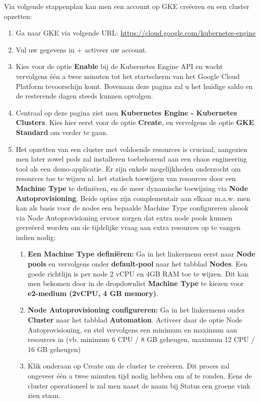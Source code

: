 Via volgende stappenplan kan men een account op GKE creëeren en een cluster opzetten: 
\begin{enumerate}
    \item Ga naar GKE via volgende URL: \url{https://cloud.google.com/kubernetes-engine}
    \item Vul uw gegevens in + activeer uw account.
    \item Kies voor de optie {\bf Enable} bij de Kubernetes Engine API en wacht vervolgens één a twee minuten tot het startscherm van het Google Cloud Platform tevoorschijn komt. Bovenaan deze pagina zal u het huidige saldo en de resterende dagen steeds kunnen opvolgen.
    \item Centraal op deze pagina ziet men {\bf Kubernetes Engine - Kubernetes Clusters}. Kies hier eerst voor de optie {\bf Create}, en vervolgens de optie {\bf GKE Standard} om verder te gaan. 
    \item Het opzetten van een cluster met voldoende resources is cruciaal, aangezien men later zowel pods zal installeren toebehorend aan een chaos engineering tool als een demo-applicatie. 
    \newline Er zijn enkele mogelijkheden onderzocht om resources toe te wijzen nl. het statisch toewijzen van resources door een {\bf Machine Type} te definiëren, en de meer dynamische toewijzing via {\bf Node Autoprovisioning}. Beide opties zijn complementair aan elkaar m.a.w. men kan als basis voor de nodes een bepaalde Machine Type configureren alsook via Node Autoprovisioning ervoor zorgen dat extra node pools kunnen gecreëerd worden om de tijdelijke vraag aan extra resources op te vangen indien nodig:  
    \begin{enumerate}
        \item {\bf Een Machine Type definiëren:} Ga in het linkermenu eerst naar {\bf Node pools} en vervolgens onder {\bf default-pool} naar het tabblad {\bf Nodes}. Een goede richtlijn is per node 2 vCPU en 4GB RAM toe te wijzen. Dit kan men bekomen door in de dropdownlist {\bf Machine Type} te kiezen voor {\bf e2-medium (2vCPU, 4 GB memory)}.
        \item {\bf Node Autoprovisioning configureren:} Ga in het linkermenu onder {\bf Cluster} naar het tabblad {\bf Automation}. Activeer daar de optie Node Autoprovisioning, en stel vervolgens een minimum en maximum aan resources in (vb. minimum 6 CPU / 8 GB geheugen, maximum 12 CPU / 16 GB geheugen)
        \item Klik onderaan op Create om de cluster te creëeren. Dit proces zal ongeveer één a twee minuten tijd nodig hebben om af te ronden. Eens de cluster operationeel is zal men naast de naam bij Status een groene vink zien staan.

\end{enumerate}
\end{enumerate}
